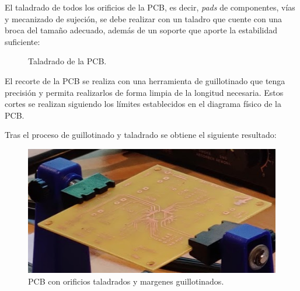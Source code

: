 \begin{enumerate}
   El taladrado de todos los orificios de la \ac{PCB}, es decir, \textit{pads} de componentes, vías y mecanizado de sujeción, se debe realizar con un taladro que cuente con una broca del tamaño adecuado, además de un soporte que aporte la estabilidad suficiente:
   
    \begin{figure}[H]
    \centering
    \caption{Taladrado de la \ac{PCB}.}
    \end{figure}
   
   El recorte de la \ac{PCB} se realiza con una herramienta de guillotinado que tenga precisión y permita realizarlos de forma limpia de la longitud necesaria. Estos cortes se realizan siguiendo los límites establecidos en el diagrama físico de la \ac{PCB}.
   
   Tras el proceso de guillotinado y taladrado se obtiene el siguiente resultado:
   
    \begin{figure}[H]
    \centering 
    \includegraphics[width=0.5\linewidth]{pictures/PCBTaladrada.PNG}
    \caption{\ac{PCB} con orificios taladrados y margenes guillotinados.}
    \end{figure}
    

\end{enumerate}
